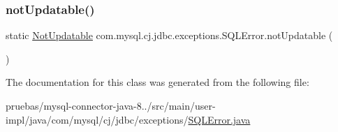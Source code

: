 \subsubsection{\texorpdfstring{not\+Updatable()}{notUpdatable()}}
{\footnotesize\ttfamily static \mbox{\hyperlink{classcom_1_1mysql_1_1cj_1_1jdbc_1_1exceptions_1_1_not_updatable}{Not\+Updatable}} com.\+mysql.\+cj.\+jdbc.\+exceptions.\+S\+Q\+L\+Error.\+not\+Updatable (\begin{DoxyParamCaption}{ }\end{DoxyParamCaption})\hspace{0.3cm}{\ttfamily [static]}}



The documentation for this class was generated from the following file\+:\begin{DoxyCompactItemize}
\item 
pruebas/mysql-\/connector-\/java-\/8../src/main/user-\/impl/java/com/mysql/cj/jdbc/exceptions/\mbox{\hyperlink{_s_q_l_error_8java}{S\+Q\+L\+Error.\+java}}\end{DoxyCompactItemize}
